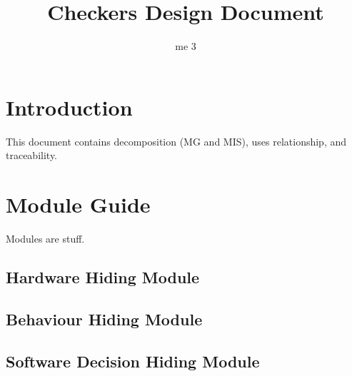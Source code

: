 \documentclass[10pt]{article}
\title{\bf Checkers Design Document}
\author{me 3}
\date{}
\begin{document}
\maketitle

\tableofcontents

\section{Introduction}
    This document contains decomposition (MG and MIS), uses relationship, and traceability.
    
\section{Module Guide}
Modules are stuff.

\subsection{Hardware Hiding Module}
\iffalse
    \begin{tikzpicture}[scale=1.5, align=center]
        \node[root] {Hardware Hiding Module}
        child {node[level 2, hyperlink node=mod:Board]{Wireless Communications}}
        child {node[level 2, hyperlink node=mod:Piece]{Clock}}
        child {node[level 2]{Positioning the nodes}}
        child {node[level 2]{Positioning the nodes}
            child[subA] {node[level 3]{Joe}}
            child[subB] {node[level 3]{Heather}}
            child[subC] {node[level 3]{Barbara}}}
        child {node[level 2]{Positioning the nodes}
            child[subA] {node[level 3]{Joe}}
            child[subB] {node[level 3]{Heather}}
            child[subC] {node[level 3]{Barbara}}}
        child {node[level 2]{Positioning the nodes}
            child[subA] {node[level 3]{Joe}}
            child[subB] {node[level 3]{Heather}}
            child[subC] {node[level 3]{Barbara}}}
        child {node[level 2]{Positioning the nodes}
            child[subA] {node[level 3]{Joe}}
            child[subB] {node[level 3]{Heather}}
            child[subC] {node[level 3]{Barbara}}}
        ;
    \end{tikzpicture}
\fi
    
\subsection{Behaviour Hiding Module}

\subsection{Software Decision Hiding Module}
\end{document}

